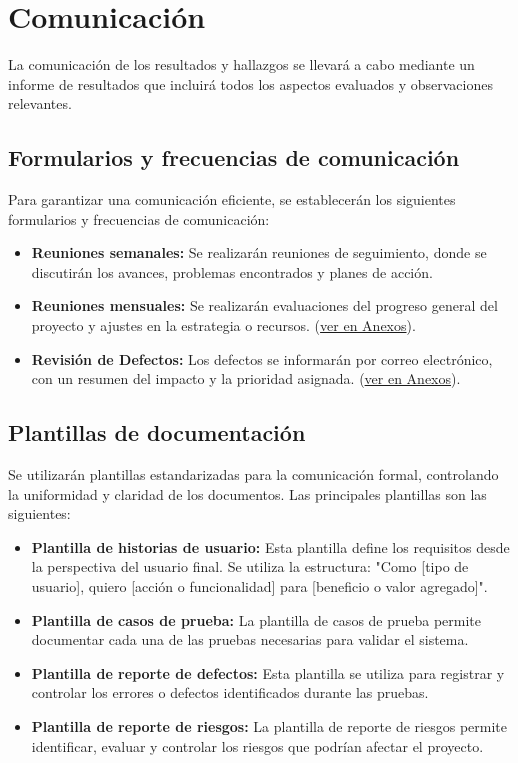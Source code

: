 \documentclass[stu, 12pt, letterpaper, donotrepeattitle, floatsintext, natbib]{apa7}
\begin{document}
\section{\large Comunicación}

\noindent La comunicación de los resultados y hallazgos se llevará a cabo mediante un informe de resultados que incluirá todos los aspectos evaluados y observaciones relevantes.

    \subsection{Formularios y frecuencias de comunicación}
        \noindent Para garantizar una comunicación eficiente, se establecerán los siguientes formularios y frecuencias de comunicación:
        \begin{itemize}
            \item \textbf{Reuniones semanales:} Se realizarán reuniones de seguimiento, donde se discutirán los avances, problemas encontrados y planes de acción. 
            \item \textbf{Reuniones mensuales:} Se realizarán evaluaciones del progreso general del proyecto y ajustes en la estrategia o recursos. (\hyperref[]{ver en Anexos}).
            \item \textbf{Revisión de Defectos:} Los defectos se informarán por correo electrónico, con un resumen del impacto y la prioridad asignada. (\hyperref[]{ver en Anexos}).
        \end{itemize}

        \subsection{Plantillas de documentación}
            \noindent Se utilizarán plantillas estandarizadas para la comunicación formal, controlando la uniformidad y claridad de los documentos. Las principales plantillas son las siguientes:
            \begin{itemize}
                \item \textbf{Plantilla de historias de usuario:} Esta plantilla define los requisitos desde la perspectiva del usuario final. Se utiliza la estructura: "Como [tipo de usuario], quiero [acción o funcionalidad] para [beneficio o valor agregado]".
                \item \textbf{Plantilla de casos de prueba:} La plantilla de casos de prueba permite documentar cada una de las pruebas necesarias para validar el sistema.
                \item \textbf{Plantilla de reporte de defectos:} Esta plantilla se utiliza para registrar y controlar los errores o defectos identificados durante las pruebas.
                \item \textbf{Plantilla de reporte de riesgos:} La plantilla de reporte de riesgos permite identificar, evaluar y controlar los riesgos que podrían afectar el proyecto.
            \end{itemize}
\end{document}
